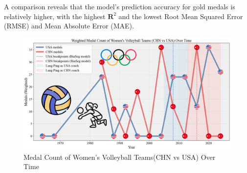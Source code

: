 \documentclass[12pt]{article}  %
\begin{document}
A comparison reveals that the model's prediction accuracy for gold medals is relatively higher, with the highest \(\mathbf{R}^2\) and the lowest Root Mean Squared Error (RMSE) and Mean Absolute Error (MAE).



\begin{figure}[htbp]
	\centering
	\includegraphics[width=12cm]{img/Volleyball.png}
	\caption{Medal Count of Women's Volleyball Teams(CHN vs USA) Over Time}
	\label{fig:aa}
\end{figure}
\end{document}

